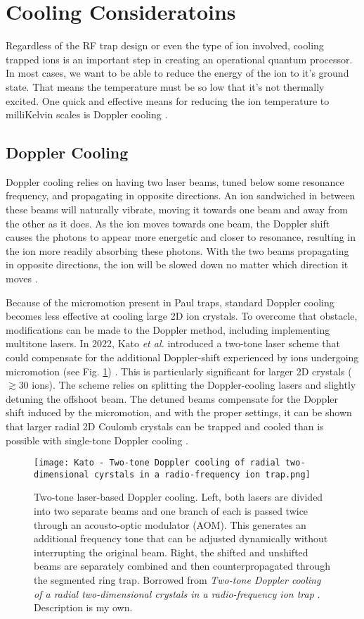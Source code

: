 \section{Cooling Consideratoins}
Regardless of the RF trap design or even the type of ion involved, cooling trapped ions is an important step in creating an operational quantum processor. In most cases, we want to be able to reduce the energy of the ion to it's ground state. That means the temperature must be so low that it's not thermally excited. One quick and effective means for reducing the ion temperature to milliKelvin scales is Doppler cooling \cite{Bruzewicz}.

\subsection{Doppler Cooling}
Doppler cooling relies on having two laser beams, tuned below some resonance frequency, and propagating in opposite directions. An ion sandwiched in between these beams will naturally vibrate, moving it towards one beam and away from the other as it does. As the ion moves towards one beam, the Doppler shift causes the photons to appear more energetic and closer to resonance, resulting in the ion more readily absorbing these photons. With the two beams propagating in opposite directions, the ion will be slowed down no matter which direction it moves \cite{LeBellac}.

Because of the micromotion present in Paul traps, standard Doppler cooling becomes less effective at cooling large 2D ion crystals. To overcome that obstacle, modifications can be made to the Doppler method, including implementing multitone lasers. In 2022, Kato \textit{et al.} introduced a two-tone laser scheme that could compensate for the additional Doppler-shift experienced by ions undergoing micromotion (see Fig. \ref{fig:Two-tone}) \cite{Kato}. This is particularly significant for larger 2D crystals ($\gtrsim 30$ ions). The scheme relies on splitting the Doppler-cooling lasers and slightly detuning the offshoot beam. The detuned beams compensate for the Doppler shift induced by the micromotion, and with the proper settings, it can be shown that larger radial 2D Coulomb crystals can be trapped and cooled than is possible with single-tone Doppler cooling \cite{Kato}.
\begin{figure}
    \texttt{[image: Kato - Two-tone Doppler cooling of radial two-dimensional cyrstals in a radio-frequency ion trap.png]}
    \caption{Two-tone laser-based Doppler cooling. Left, both lasers are divided into two separate beams and one branch of each is passed twice through an acousto-optic modulator (AOM). This generates an additional frequency tone that can be adjusted dynamically without interrupting the original beam. Right, the shifted and unshifted beams are separately combined and then counterpropagated through the segmented ring trap. Borrowed from \textit{Two-tone Doppler cooling of a radial two-dimensional crystals in a radio-frequency ion trap} \cite{Kato}. Description is my own.}
    \label{fig:Two-tone}
\end{figure}

